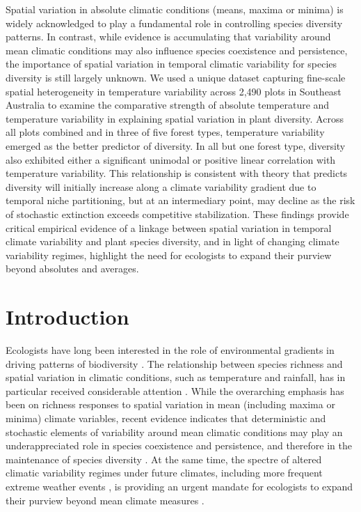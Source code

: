 Spatial variation in absolute climatic conditions (means, maxima or minima) is widely acknowledged to play a fundamental role in controlling species diversity patterns. In contrast, while evidence is accumulating that variability around mean climatic conditions may also influence species coexistence and persistence, the importance of spatial variation in temporal climatic variability for species diversity is still largely unknown. We used a unique dataset capturing fine-scale spatial heterogeneity in temperature variability across 2,490 plots in Southeast Australia to examine the comparative strength of absolute temperature and temperature variability in explaining spatial variation in plant diversity. Across all plots combined and in three of five forest types, temperature variability emerged as the better predictor of diversity. In all but one forest type, diversity also exhibited either a significant unimodal or positive linear correlation with temperature variability. This relationship is consistent with theory that predicts diversity will initially increase along a climate variability gradient due to temporal niche partitioning, but at an intermediary point, may decline as the risk of stochastic extinction exceeds competitive stabilization. These findings provide critical empirical evidence of a linkage between spatial variation in temporal climate variability and plant species diversity, and in light of changing climate variability regimes, highlight the need for ecologists to expand their purview beyond absolutes and averages.

\newpage
\section{Introduction}

Ecologists have long been interested in the role of environmental gradients in driving patterns of biodiversity \citep{Fox2011}. The relationship between species richness and spatial variation in climatic conditions, such as temperature and rainfall, has in particular received considerable attention \citep[e.g.][]{O'Brien1998, Currie2004, Kozak2012}. While the overarching emphasis has been on richness responses to spatial variation in mean (including maxima or minima) climate variables, recent evidence indicates that deterministic and stochastic elements of variability around mean climatic conditions may play an underappreciated role in species coexistence and persistence, and therefore in the maintenance of species diversity \citep{Chesson2000, Levine2004, Adler2006}. At the same time, the spectre of altered climatic variability regimes under future climates, including more frequent extreme weather events \citep{Easterling2000a, ippc2007, Hansen2012}, is providing an urgent mandate for ecologists to expand their purview beyond mean climate measures \citep{Adler2008, Shurin2010, White2010}.

